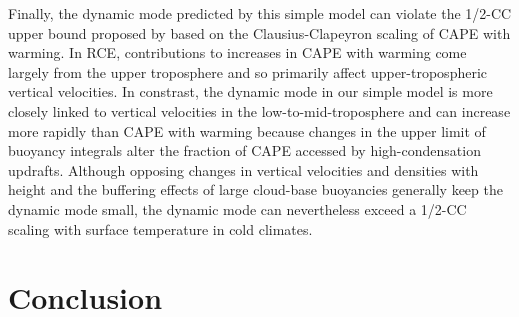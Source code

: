 \documentclass[twocol]{ametsoc}
\begin{document}
Finally, the dynamic mode predicted by this simple model can violate the 1/2-CC upper bound proposed by \citet{Fildier2017SimultaneousChange} based on the Clausius-Clapeyron scaling of CAPE with warming. In RCE, contributions to increases in CAPE with warming come largely from the upper troposphere \citep{Singh2013InfluenceEquilibrium,Seeley2015WhyWarming,Seeley2016TropicalIce} and so primarily affect upper-tropospheric vertical velocities. In constrast, the dynamic mode in our simple model is more closely linked to vertical velocities in the low-to-mid-troposphere and can increase more rapidly than CAPE with warming because changes in the upper limit of buoyancy integrals alter the fraction of CAPE accessed by high-condensation updrafts. Although opposing changes in vertical velocities and densities with height and the buffering effects of large cloud-base buoyancies generally keep the dynamic mode small, the dynamic mode can nevertheless exceed a 1/2-CC scaling with surface temperature in cold climates.

\section{Conclusion} \label{sec:conc}
\end{document}
